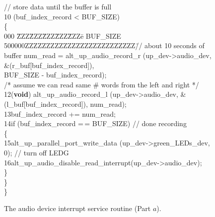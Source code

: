\documentclass[11pt, twoside, pdftex]{article}
\begin{document}
\begin{figure}[h!]
\begin{center}
\begin{minipage}[t]{12.5 cm}
\begin{tabbing}
\>\>\>// store data until the buffer is full\\
10 \>\> (buf\_index\_record < BUF\_SIZE)\\
\>\>\>\{\\
000 \=ZZZ\=ZZZ\=ZZZ\=ZZZ\=ZZZ\=e  BUF\_SIZE 500000ZZZZZZZZZZZZZZZZZZZZZZZZZZ\=// about 10 seconds of buffer \>\>\>\>num\_read = alt\_up\_audio\_record\_r (up\_dev->audio\_dev, \&(r\_buf[buf\_index\_record]), \\
\>\>\>\>\>BUF\_SIZE - buf\_index\_record);\\
\>\>\>\>/* assume we can read same \# words from the left and right */\\
12\>\>\>\>({\bf void}) alt\_up\_audio\_record\_l (up\_dev->audio\_dev, \&(l\_buf[buf\_index\_record]), num\_read);\\
13\>\>\>\>buf\_index\_record += num\_read;\\
 
14\>\>\>\>if (buf\_index\_record =$\,$= BUF\_SIZE) \>\>\>// done recording\\
\>\>\>\>\{\\
15\>\>\>\>\>alt\_up\_parallel\_port\_write\_data (up\_dev->green\_LEDs\_dev, 0); \>\>// turn off LEDG\\
16\>\>\>\>\>alt\_up\_audio\_disable\_read\_interrupt(up\_dev->audio\_dev);\\
\>\>\>\>\}\\
\>\>\>\}\\
\>\>\}\\
\end{tabbing}
\end{minipage}
\end{center}
	\vspace{-0.33in}\caption{The audio device interrupt service routine (Part $a$).}
   \label{fig:audio_ISR}
\end{figure}
\clearpage
\end{document}
